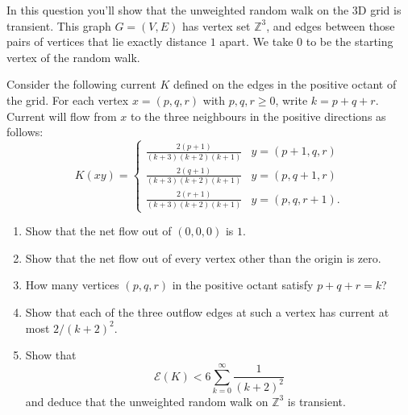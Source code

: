 \documentclass[12 pt, letterpaper]{hmcpset}
\begin{document}
\begin{problem}[49.]
	In this question you'll show that the unweighted random walk on the 3D grid is transient. This graph $G = (V, E)$ has vertex set $\mathbb{Z}^{3}$, and edges between those pairs of vertices that lie exactly distance $1$ apart. We take $0$ to be the starting vertex of the random walk.

	Consider the following current $K$ defined on the edges in the positive octant of the grid. For each vertex $x = (p, q, r)$ with $p, q, r \ge 0$, write $k = p + q + r$. Current will flow from $x$ to the three neighbours in the positive directions as follows:
	\[
		K(xy) = \begin{cases}
			\frac{2(p + 1)}{(k + 3) (k + 2) (k + 1)} & y = (p + 1, q, r) \\
			\frac{2(q + 1)}{(k + 3) (k + 2) (k + 1)} & y = (p, q + 1, r) \\
			\frac{2(r + 1)}{(k + 3) (k + 2) (k + 1)} & y = (p, q, r + 1).
		\end{cases}
	\]

	\begin{enumerate}
		\item Show that the net flow out of $(0, 0, 0)$ is $1$.
		\item Show that the net flow out of every vertex other than the origin is zero.
		\item How many vertices $(p, q, r)$ in the positive octant satisfy $p + q + r = k$?
		\item Show that each of the three outflow edges at such a vertex has current at most $2 / (k + 2)^{2}$.
		\item Show that
			\[
				\mathcal{E}(K) < 6 \sum_{k = 0}^{\infty} \frac{1}{(k + 2)^{2}}
			\]
			and deduce that the unweighted random walk on $\mathbb{Z}^{3}$ is transient.
	\end{enumerate}	
\end{problem}
\end{document}

